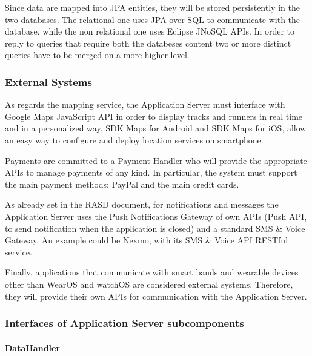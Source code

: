 Since data are mapped into JPA entities, they will be stored persistently in the two databases. The relational one uses JPA over SQL to communicate with the database, while the non relational one uses Eclipse JNoSQL APIs.
In order to reply to queries that require both the databeses content two or more distinct queries have to be merged on a more higher level. 


\subsubsection{External Systems}

As regards the mapping service, the Application Server must interface with Google Maps JavaScript API in order to display tracks and runners in real time and in a personalized way, SDK Maps for Android and SDK Maps for iOS, allow an easy way to configure and deploy location services on smartphone.

Payments are committed to a Payment Handler who will provide the appropriate APIs to manage payments of any kind. In particular, the system must support the main payment methods: PayPal and the main credit cards.

As already set in the RASD document, for notifications and messages the Application Server uses the Push Notifications Gateway of own APIs (Push API, to send notification when the application is closed) and a standard SMS \& Voice Gateway. 
An example could be Nexmo, with its SMS \& Voice API RESTful service.

Finally, applications that communicate with smart bands and wearable devices other than WearOS and watchOS are considered external systems. Therefore, they will provide their own APIs for communication with the Application Server.

\subsubsection{Interfaces of Application Server subcomponents}

\paragraph*{DataHandler}

